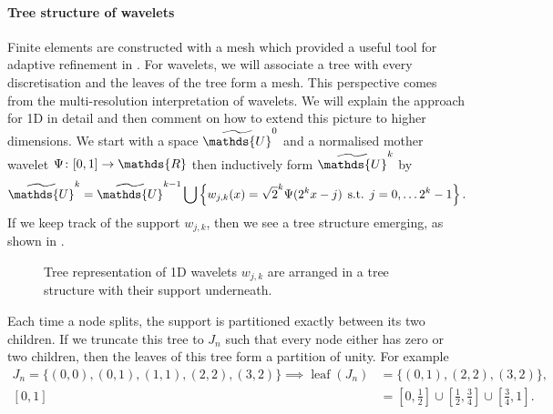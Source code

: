 \documentclass[10pt,a4paper,onecolumn]{article}
\numberwithin{equation}{section}
\let\F\mathds\let\C\mathcal\newcommand{\R}{\F{R}}\newcommand{\A}{\C{A}}
\newcommand{\op}[1]{\operatorname{#1}}\newcommand{\overtext}[2]{\stackrel{\text{#1}}{#2}}
\DeclareMathOperator{\st}{\;s.t.\;}\DeclareMathOperator{\as}{\;a.s.\;}\renewcommand{\epsilon}{\varepsilon}
\newcommand*{\spcf}[1]{%
	\IfEqCase{#1}{%
		{0}{\F{U}}%
		{1}{\F{V}}%
		{2}{\F{W}}%
	}[\F{U}#1]%
}
\newcommand*{\vard}[1]{%
	\IfEqCase{#1}{%
		{0}{\varphi}%
		{1}{\psi}%
	}[\varphi #1]%
}
\newcommand*{\varx}[1]{%
	\IfEqCase{#1}{%
		{0}{x}%
		{1}{y}%
		{2}{z}%
		{3}{r}%
	}[x#1]%
}
\begin{document}
\paragraph{Tree structure of wavelets}
Finite elements are constructed with a mesh which provided a useful tool for adaptive refinement in . For wavelets, we will associate a tree with every discretisation and the leaves of the tree form a mesh. This perspective comes from the multi-resolution interpretation of wavelets. We will explain the approach for 1D in detail and then comment on how to extend this picture to higher dimensions. We start with a space $\tilde{\spcf0}^0$ and a normalised mother wavelet $\vard1\colon[0,1]\to \R$ then inductively form $\tilde{\spcf0}^k$ by
$$\tilde{\spcf0}^k = \tilde{\spcf0}^{k-1}\bigcup\left\{w_{j,k}(\varx0) = \sqrt{2}^k\vard1(2^{k}\varx0-j)\st j=0,\ldots 2^k-1\right\}.$$
If we keep track of the support $w_{j,k}$, then we see a tree structure emerging, as shown in .
\begin{figure}\begin{center}\end{center}
	\caption{Tree representation of 1D wavelets $w_{j,k}$ are arranged in a tree structure with their support underneath.}\label{fig: wavelet tree}
\end{figure}
Each time a node splits, the support is partitioned exactly between its two children. If we truncate this tree to $J_n$ such that every node either has zero or two children, then the leaves of this tree form a partition of unity. For example
\begin{align*}
	J_n = \{(0,0), (0,1),(1,1), (2,2), (3,2)\} \implies \op{leaf}(J_n) &= \{(0,1), (2,2), (3,2)\}, 
	\\ [0,1] &= [0,\tfrac12]\cup[\tfrac12,\tfrac34]\cup[\tfrac34,1].
\end{align*}
\end{document}

